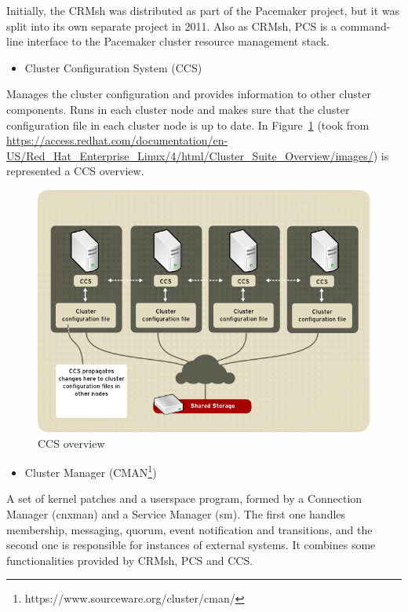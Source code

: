 \documentclass[a4paper, 12pt]{book}
\begin{document}
\noindent Initially, the CRMsh was distributed as part of the Pacemaker project, but it was split into its own separate project in 2011. Also as CRMsh, PCS is a command-line interface to the Pacemaker cluster resource management stack.

\begin{itemize}
	\item Cluster Configuration System (CCS)
\end{itemize}

\noindent Manages the cluster configuration and provides information to other cluster components. Runs in each cluster node and makes sure that the cluster configuration file in each cluster node is up to date. In Figure~\ref{fig:ccs} (\small {took from \url{https://access.redhat.com/documentation/en-US/Red_Hat_Enterprise_Linux/4/html/Cluster_Suite_Overview/images/}}) is represented a CCS overview.

\begin{figure}[H]
  \centering
  \includegraphics[scale=0.50]{ccs-overview.png}
  \caption[CCS overview]{CCS overview}
  \label{fig:ccs}
\end{figure}

\begin{itemize}
	\item Cluster Manager (CMAN\footnote{https://www.sourceware.org/cluster/cman/})
\end{itemize}

\noindent A set of kernel patches and a userspace program, formed by a Connection Manager (cnxman) and a Service Manager (sm). The first one handles membership, messaging, quorum, event notification and transitions, and the second one is responsible for instances of external systems. It combines some functionalities provided by CRMsh, PCS and CCS.
\end{document}
